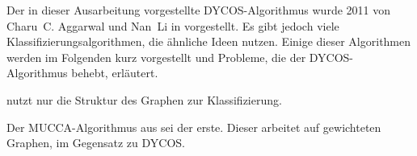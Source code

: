Der in dieser Ausarbeitung vorgestellte DYCOS-Algorithmus wurde 2011 von
Charu~C. Aggarwal und Nan~Li in \cite{aggarwal2011} vorgestellt.
Es gibt jedoch viele Klassifizierungsalgorithmen, die ähnliche Ideen
nutzen. Einige dieser Algorithmen werden im Folgenden kurz vorgestellt
und Probleme, die der DYCOS-Algorithmus behebt, erläutert.

\cite{DBLP:conf/kdd/BhagatCR07} nutzt nur die Struktur des Graphen 
zur Klassifizierung.

Der MUCCA-Algorithmus aus \cite{zappella} sei der erste. Dieser
arbeitet auf gewichteten Graphen, im Gegensatz zu DYCOS.
